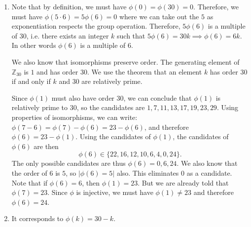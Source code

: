 \begin{sol}
    \begin{enumerate}
        \item
              Note that by definition, we must have $\phi(0)=\phi(30)=0.$ Therefore, we must have $\phi(5\cdot 6)=5\phi(6)=0$ where we can take out the $5$ as exponentiation respects the group operation. Therefore, $5\phi(6)$ is a multiple of $30$, i.e. there exists an integer $k$ such that $5\phi(6)=30k \implies \phi(6)=6k$. In other words $\phi(6)$ is a multiple of $6$.
              \vspace{2mm}

              We also know that isomorphisms preserve order. The generating element of $\mathbb{Z}_{30}$ is $1$ and has order $30$. We use the theorem that an element $k$ has order $30$ if and only if $k$ and $30$ are relatively prime.
              \vspace{2mm}

              Since $\phi(1)$ must also have order $30$, we can conclude that $\phi(1)$ is relatively prime to $30$, so the candidates are $1,7,11,13,17,19,23,29$. Using properties of isomorphisms, we can write: $\phi(7-6)=\phi(7)-\phi(6)=23-\phi(6)$, and therefore $\phi(6)=23-\phi(1)$. Using the candidates of $\phi(1)$, the candidates of $\phi(6)$ are then
              $$\phi(6) \in \{22,16,12,10,6,4,0,24\}.$$
              The only possible candidates are thus $\phi(6)=0,6,24$. We also know that the order of $6$ is $5$, so $|\phi(6)=5|$ also. This eliminates $0$ as a candidate. Note that if $\phi(6)=6$, then $\phi(1)=23$. But we are already told that $\phi(7)=23$. Since $\phi$ is injective, we must have $\phi(1) \neq 23$ and therefore $\phi(6)=24$.
        \item It corresponds to $\phi(k) = 30-k.$
    \end{enumerate}

\end{sol}